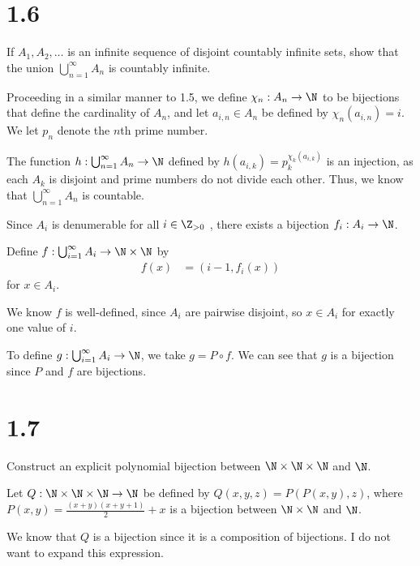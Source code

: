 \documentclass[10pt]{mypackage}
\begin{document}
\section{1.6}%
\begin{problem}
  If $A_1,A_2,\dots$ is an infinite sequence of disjoint countably infinite sets, show that the union $\bigcup_{n=1}^{\infty} A_n$ is countably infinite.
\end{problem}
\begin{solution}
  Proceeding in a similar manner to 1.5, we define $\chi_n: A_n\rightarrow \N$ to be bijections that define the cardinality of $A_n$, and let $a_{i,n}\in A_n$ be defined by $\chi_n\left(a_{i,n}\right) = i$. We let $p_n$ denote the $n$th prime number.\newline

  The function $h: \bigcup_{n=1}^{\infty}A_n\rightarrow \N$ defined by $h\left(a_{i,k}\right) = p_k^{\chi_k\left(a_{i,k}\right)}$ is an injection, as each $A_k$ is disjoint and prime numbers do not divide each other. Thus, we know that $\bigcup_{n=1}^{\infty}A_n$ is countable.
\end{solution}
{
  \color{blue}
  \begin{solution}
    Since $A_i$ is denumerable for all $i\in \Z_{> 0}$ , there exists a bijection $f_i: A_i \rightarrow \N$.\newline

    Define $f: \bigcup_{i=1}^{\infty}A_i\rightarrow \N\times \N$ by 
    \begin{align*}
      f(x) &= \left(i-1, f_{i}\left(x\right)\right)
    \end{align*}
    for $x\in A_i$.\newline

    We know $f$ is well-defined, since $A_i$ are pairwise disjoint, so $x\in A_i$ for exactly one value of $i$.\newline

    To define $g: \bigcup_{i=1}^{\infty}A_i \rightarrow \N$, we take $g = P\circ f$. We can see that $g$ is a bijection since $P$ and $f$ are bijections.
  \end{solution}
}
\section{1.7}%
\begin{problem}
  Construct an explicit polynomial bijection between $\N\times\N\times\N$ and $\N$.
\end{problem}
\begin{solution}
  Let $Q: \N\times\N\times\N \rightarrow \N$ be defined by $Q(x,y,z) = P\left(P(x,y),z\right)$, where $P(x,y) = \frac{(x+y)(x+y+1)}{2} + x$ is a bijection between $\N\times\N$ and $\N$.\newline

  We know that $Q$ is a bijection since it is a composition of bijections. I do not want to expand this expression.
\end{solution}
\end{document}
